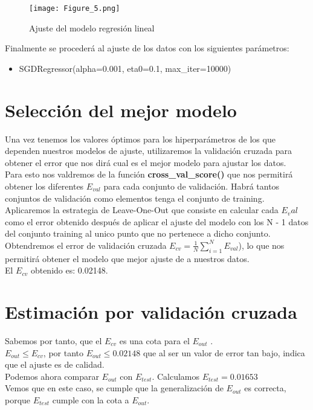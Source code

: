 \begin{figure}[H]
   \centering
   \texttt{[image: Figure\_5.png]}
   \caption{Ajuste del modelo regresión lineal}
\end{figure}


Finalmente se procederá al ajuste de los datos con los siguientes parámetros:
\begin{itemize}
   \item SGDRegressor(alpha=0.001, eta0=0.1, max\_iter=10000)
\end{itemize}

\newpage

\section{Selección del mejor modelo}
Una vez tenemos los valores óptimos para los hiperparámetros de los que dependen nuestros modelos de ajuste, utilizaremos la validación cruzada para obtener el error que nos dirá cual es el mejor modelo para ajustar los datos.\\
Para esto nos valdremos de la función \textbf{cross\_val\_score()} \cite{Score} que nos permitirá obtener los diferentes $E_{val}$ para cada conjunto de validación. Habrá tantos conjuntos de validación como elementos tenga el conjunto de training. Aplicaremos la estrategia de Leave-One-Out que consiste en calcular cada $E_val$ como el error obtenido después de aplicar el ajuste del modelo con los N - 1 datos del conjunto training al unico punto que no pertenece a dicho conjunto. Obtendremos el error de validación cruzada $E_{cv} = \frac{1}{N}\sum_{i=1}^{N}E_{val}$), lo que nos permitirá obtener el modelo que mejor ajuste de a nuestros datos.\\
El $E_{cv}$ obtenido es: 0.02148.

\section{Estimación por validación cruzada}
Sabemos por tanto, que el $E_{cv}$ es una cota para el $E_{out}$ \cite{Cota}.\\
$E_{out} \leq E_{cv}$, por tanto $E_{out} \leq 0.02148$ que al ser un valor de error tan bajo, indica que el ajuste es de calidad.\\
Podemos ahora comparar $E_{out}$ con $E_{test}$. Calculamos $E_{test} = 0.01653$
\\
Vemos que en este caso, se cumple que la generalización de $E_{out}$ es correcta, porque $E_{test}$ cumple con la cota a $E_{out}$.

